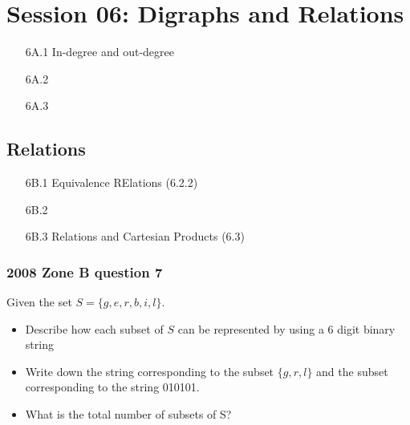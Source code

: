 \documentclass{article}
\begin{document}
\section*{Session 06: Digraphs and Relations}
\begin{itemize}
\item[6A.1] In-degree and out-degree
\item[6A.2]
\item[6A.3]
\end{itemize}
\subsection*{Relations}
\begin{itemize}
\item[6B.1] Equivalence RElations (6.2.2)
\item[6B.2]
\item[6B.3] Relations and Cartesian Products (6.3)
\end{itemize}



\subsubsection*{2008 Zone B question 7}
Given the set $S =\{g,e,r,b,i,l\}$.
\begin{itemize}
\item Describe how each subset of $S$ can be represented by using a 6 digit binary string
\item Write down the string corresponding to the subset $\{g,r,l\}$ and the subset corresponding to the string 010101.
\item What is the total number of subsets of S?
\end{itemize}
\end{document}
